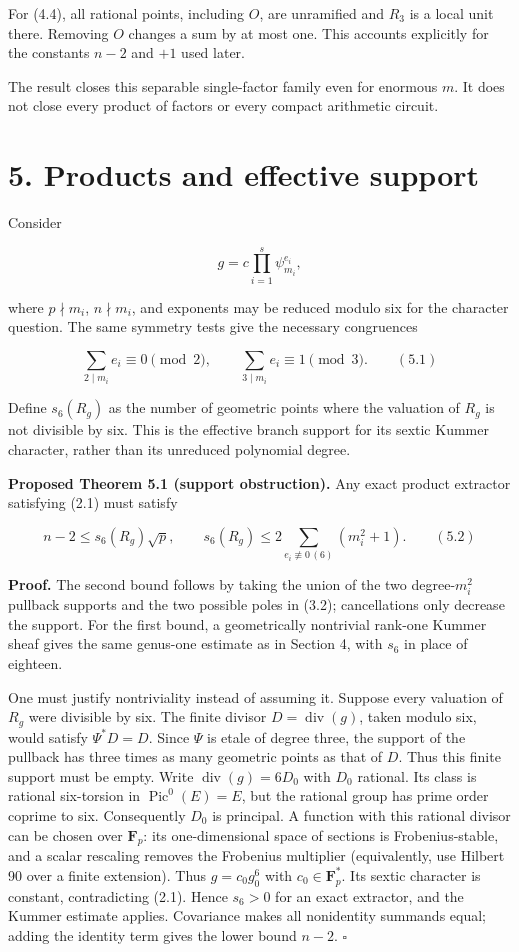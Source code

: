 \documentclass[
  11pt,
  a4paper,
]{article}
\begin{document}
For (4.4), all rational points, including \(O\), are unramified and
\(R_3\) is a local unit there. Removing \(O\) changes a sum by at most
one. This accounts explicitly for the constants \(n-2\) and \(+1\) used
later.

The result closes this separable single-factor family even for enormous
\(m\). It does not close every product of factors or every compact
arithmetic circuit.

\section{5. Products and effective
support}\label{products-and-effective-support}

Consider

\[
g=c\prod_{i=1}^s\psi_{m_i}^{e_i},
\]

where \(p\nmid m_i\), \(n\nmid m_i\), and exponents may be reduced
modulo six for the character question. The same symmetry tests give the
necessary congruences

\[
\sum_{2\mid m_i}e_i\equiv0\pmod2,\qquad
\sum_{3\mid m_i}e_i\equiv1\pmod3. \qquad (5.1)
\]

Define \(s_6(R_g)\) as the number of geometric points where the
valuation of \(R_g\) is not divisible by six. This is the effective
branch support for its sextic Kummer character, rather than its
unreduced polynomial degree.

\textbf{Proposed Theorem 5.1 (support obstruction).} Any exact product
extractor satisfying (2.1) must satisfy

\[
n-2\leq s_6(R_g)\sqrt p,\qquad
s_6(R_g)\leq2\sum_{e_i\not\equiv0\,(6)}(m_i^2+1). \qquad (5.2)
\]

\textbf{Proof.} The second bound follows by taking the union of the two
degree-\(m_i^2\) pullback supports and the two possible poles in (3.2);
cancellations only decrease the support. For the first bound, a
geometrically nontrivial rank-one Kummer sheaf gives the same genus-one
estimate as in Section 4, with \(s_6\) in place of eighteen.

One must justify nontriviality instead of assuming it. Suppose every
valuation of \(R_g\) were divisible by six. The finite divisor
\(D=\operatorname{div}(g)\), taken modulo six, would satisfy
\(\Psi^*D=D\). Since \(\Psi\) is etale of degree three, the support of
the pullback has three times as many geometric points as that of \(D\).
Thus this finite support must be empty. Write
\(\operatorname{div}(g)=6D_0\) with \(D_0\) rational. Its class is
rational six-torsion in \(\operatorname{Pic}^0(E)=E\), but the rational
group has prime order coprime to six. Consequently \(D_0\) is principal.
A function with this rational divisor can be chosen over
\(\mathbf F_p\): its one-dimensional space of sections is
Frobenius-stable, and a scalar rescaling removes the Frobenius
multiplier (equivalently, use Hilbert 90 over a finite extension). Thus
\(g=c_0g_0^6\) with \(c_0\in\mathbf F_p^*\). Its sextic character is
constant, contradicting (2.1). Hence \(s_6>0\) for an exact extractor,
and the Kummer estimate applies. Covariance makes all nonidentity
summands equal; adding the identity term gives the lower bound \(n-2\).
\(\square\)
\end{document}
